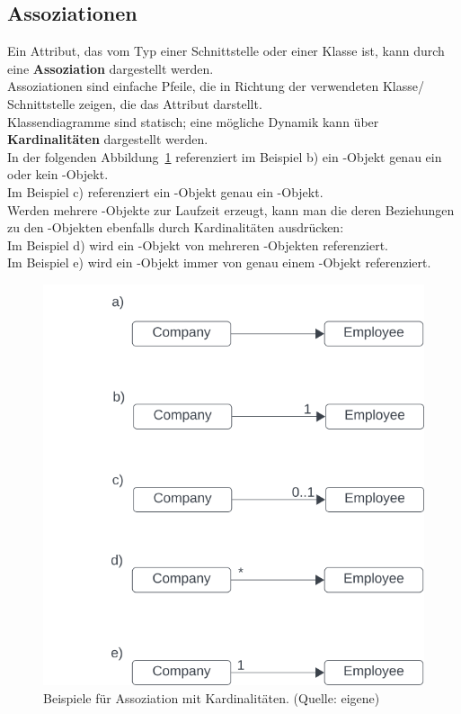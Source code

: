 \subsection{Assoziationen}

Ein Attribut, das vom Typ einer Schnittstelle oder einer Klasse ist, kann durch eine \textbf{Assoziation} dargestellt werden.\\

\noindent
Assoziationen sind einfache Pfeile, die in Richtung der verwendeten Klasse/ Schnittstelle zeigen, die das Attribut darstellt.\\

\noindent
Klassendiagramme sind statisch; eine mögliche Dynamik kann über \textbf{Kardinalitäten} dargestellt werden.\\
In der folgenden Abbildung~\ref{fig:association} referenziert im Beispiel b) ein -Objekt genau ein oder kein -Objekt.\\
Im Beispiel c) referenziert ein -Objekt genau ein -Objekt.\\

\noindent
Werden mehrere -Objekte zur Laufzeit erzeugt, kann man die deren Beziehungen zu den -Objekten ebenfalls durch Kardinalitäten ausdrücken:\\
\noindent
Im Beispiel d) wird ein -Objekt von mehreren -Objekten referenziert.\\
\noindent
Im Beispiel e) wird ein -Objekt immer von genau einem -Objekt referenziert.

\begin{figure}
    \centering
    \includegraphics[scale=0.5]{chapters/fopt3/img/association}
    \caption{Beispiele für Assoziation mit Kardinalitäten. (Quelle: eigene)}
    \label{fig:association}
\end{figure}

